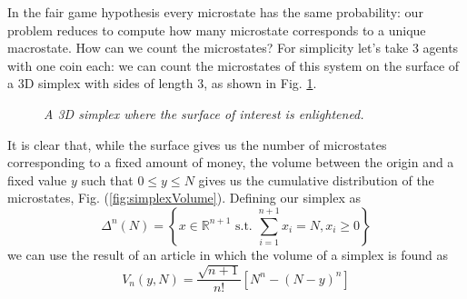 In the fair game hypothesis every microstate has the same probability: our problem reduces to compute how many microstate corresponds to a unique macrostate.
How can we count the microstates?
For simplicity let's take 3 agents with one coin each: we can count the microstates of this system on the surface of a 3D simplex with sides of length 3, as shown in Fig. \ref{fig:threeSimplex}.
\begin{figure}[ht!]
    \centering
    \caption{\emph{A 3D simplex where the surface of interest is enlightened.}}
    \label{fig:threeSimplex}
\end{figure}
It is clear that, while the surface gives us the number of microstates corresponding to a fixed amount of money, the volume between the origin and a fixed value $y$ such that $0 \leq y \leq N$ gives us the cumulative distribution of the microstates, Fig. (\ref{fig:simplexVolume}).
Defining our simplex as
\begin{equation*}
    \Delta^n(N)=\left\{x \in \mathbb{R}^{n+1}\text{ s.t. } \sum_{i = 1}^{n + 1}x_i = N, x_i \geq 0\right\}
\end{equation*}
we can use the result of an article \cite{simplexSampling} in which the volume of a simplex is found as
\begin{equation}
    V_n\left(y, N\right) = \frac{\sqrt{n+1}}{n!}\left[N^n - \left(N - y\right)^n\right]
\end{equation}
